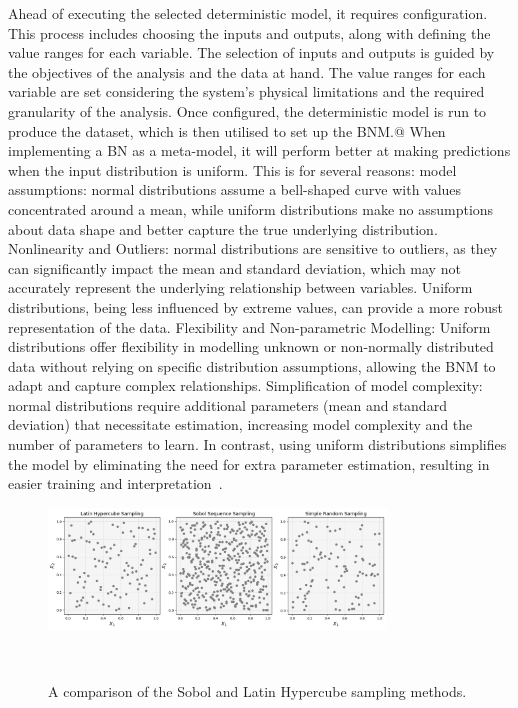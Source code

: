 \documentclass[journal]{IEEEtran}
\begin{document}
Ahead of executing the selected deterministic model, it requires configuration. This process includes choosing the inputs and outputs, along with defining the value ranges for each variable. The selection of inputs and outputs is guided by the objectives of the analysis and the data at hand. The value ranges for each variable are set considering the system's physical limitations and the required granularity of the analysis. Once configured, the deterministic model is run to produce the dataset, which is then utilised to set up the BNM.@ When implementing a BN as a meta-model, it will perform better at making predictions when the input distribution is uniform. This is for several reasons: model assumptions: normal distributions assume a bell-shaped curve with values concentrated around a mean, while uniform distributions make no assumptions about data shape and better capture the true underlying distribution. Nonlinearity and Outliers: normal distributions are sensitive to outliers, as they can significantly impact the mean and standard deviation, which may not accurately represent the underlying relationship between variables. Uniform distributions, being less influenced by extreme values, can provide a more robust representation of the data. Flexibility and Non-parametric Modelling: Uniform distributions offer flexibility in modelling unknown or non-normally distributed data without relying on specific distribution assumptions, allowing the BNM to adapt and capture complex relationships. Simplification of model complexity: normal distributions require additional parameters (mean and standard deviation) that necessitate estimation, increasing model complexity and the number of parameters to learn. In contrast, using uniform distributions simplifies the model by eliminating the need for extra parameter estimation, resulting in easier training and interpretation~\cite{Duda1973,Neapolitan2004, Koller2009}.

\begin{figure}[t]
    \centering
    \includegraphics[width=0.8\textwidth]{figures/methodology/sobol_vs_lhs_simple.png}
    \caption{\small A comparison of the Sobol and Latin Hypercube sampling methods.}~\label{fig:sobol_vs_lhs}
\end{figure}
\end{document}
